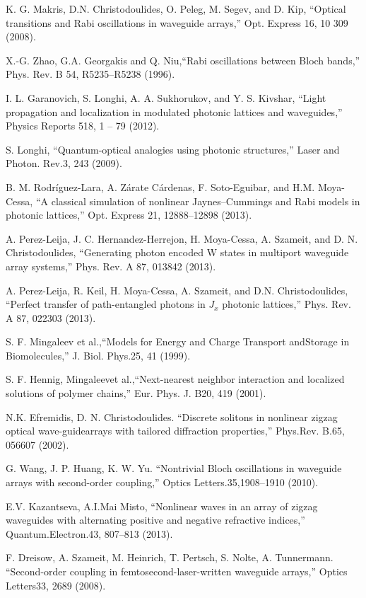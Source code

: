 \documentclass[12pt]{article}
\numberwithin{equation}{section}
\begin{document}
\begin{thebibliography}{unsrt}
 K. G. Makris, D.N. Christodoulides, O. Peleg, M. Segev, and D. Kip, “Optical transitions and Rabi oscillations in waveguide arrays,” Opt. Express 16, 10 309 (2008).

 X.-G. Zhao, G.A. Georgakis and Q. Niu,“Rabi oscillations between Bloch bands,” Phys. Rev. B 54, R5235–R5238 (1996).

 I. L. Garanovich, S. Longhi, A. A. Sukhorukov,   and Y. S. Kivshar,  “Light propagation and localization in modulated photonic lattices and waveguides,” Physics Reports 518, 1 – 79 (2012). 

 S. Longhi, “Quantum-optical analogies using photonic structures,” Laser and Photon. Rev.3, 243 (2009).

 B. M. Rodríguez-Lara, A. Zárate Cárdenas, F. Soto-Eguibar, and H.M. Moya-Cessa, “A classical simulation of nonlinear Jaynes--Cummings and Rabi models in photonic lattices,” Opt. Express 21, 12888--12898 (2013).

 A. Perez-Leija, J. C. Hernandez-Herrejon, H. Moya-Cessa, A. Szameit, and D. N. Christodoulides, “Generating photon encoded W states in multiport waveguide array systems,” Phys. Rev. A 87, 013842 (2013).

 A. Perez-Leija, R. Keil, H. Moya-Cessa, A. Szameit, and D.N. Christodoulides, “Perfect transfer of path-entangled photons in $J_x$  photonic lattices,” Phys. Rev. A 87, 022303 (2013).

 S. F. Mingaleev et al.,“Models for Energy and Charge Transport andStorage in Biomolecules,” J. Biol. Phys.25, 41 (1999).

  S. F. Hennig, Mingaleevet al.,“Next-nearest neighbor interaction and localized solutions of polymer chains,” Eur. Phys. J. B20, 419 (2001).

 N.K. Efremidis, D. N. Christodoulides. “Discrete solitons in nonlinear zigzag optical wave-guidearrays with tailored diffraction properties,” Phys.Rev. B.65, 056607 (2002).

 G. Wang, J. P. Huang, K. W. Yu. “Nontrivial Bloch oscillations in waveguide arrays with second-order coupling,” Optics Letters.35,1908–1910 (2010).

 E.V. Kazantseva, A.I.Mai Misto, “Nonlinear waves in an array of zigzag waveguides with alternating positive and negative refractive indices,” Quantum.Electron.43, 807–813 (2013).

 F. Dreisow, A. Szameit, M. Heinrich, T. Pertsch, S. Nolte, A. Tunnermann. “Second-order coupling in femtosecond-laser-written waveguide arrays,” Optics Letters33, 2689 (2008).


\end{thebibliography}
\end{document}
